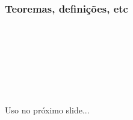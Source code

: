 \begin{frame}
  \frametitle{Teoremas, definições, etc}

  \begin{exemplo}[no cabeçalho]
    \bigskip

    \begin{ttfamily}\small
      \green{\string\theoremstyle}\\
      \purple{\string\newtheorem}\brown{[chapter]}\\
      \purple{\string\newtheorem}\brown{[teo]}\\
      \ \\
      \green{\string\theoremstyle}\\
      \purple{\string\newtheorem}\brown{[teo]}\\
    \end{ttfamily}

  \end{exemplo}

  {\small Uso no próximo slide...}
  
\end{frame}

